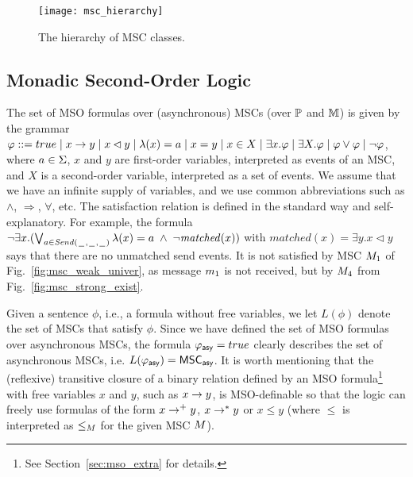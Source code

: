 \begin{figure}[h]
	\centering
	\texttt{[image: msc\_hierarchy]}
	\caption{The hierarchy of MSC classes.}
\end{figure}

\subsection{Monadic Second-Order Logic}

The set of MSO formulas over (asynchronous) MSCs (over $\mathbb{P}$ and $\mathbb{M}$) is given by the grammar
$
\varphi ::= true \mid x \to y \mid x \lhd y \mid \lambda(x) = a \mid x = y \mid x \in X \mid \exists x.\varphi \mid \exists X.\varphi \mid \varphi \vee \varphi \mid \neg \varphi
$,
where $a \in \Sigma$, $x$ and $y$ are first-order variables, interpreted as
events of an MSC, and $X$ is a second-order variable, interpreted
as a set of events. We assume that we have an infinite supply of variables,
and we use common abbreviations such as $\wedge$, $\Rightarrow$, $\forall$, etc.
The satisfaction relation is defined in the standard way and self-explanatory.
For example, the formula $\neg\exists x.(\bigvee_{a \in {\mathit{Send}(\hspace{0.1em}\underline{\hspace{0.5em}}\hspace{0.1em},\hspace{0.1em}\underline{\hspace{0.5em}}\hspace{0.1em},\hspace{0.1em}\underline{\hspace{0.5em}}\hspace{0.1em})}} \lambda(x) = a \;\wedge\; \neg \mathit{matched}(x))$
with $\mathit{matched}(x) = \exists y.x \lhd y$
says that there are no unmatched send events.
It is not satisfied by  MSC $M_{1}$
of Fig.~\ref{fig:msc_weak_univer},
as message $m_1$ is not received,
but by $M_{4}$ from Fig.~\ref{fig:msc_strong_exist}.

Given a sentence $\phi$, i.e., a formula without free variables,
we let $L(\phi)$ denote the set of MSCs that satisfy $\phi$. Since we have defined the set of MSO formulas over asynchronous MSCs, the formula $\varphi_{\mathsf{asy}} = true$ clearly describes the set of asynchronous MSCs, i.e. $L(\varphi_{\mathsf{asy}}) = \mathsf{MSC}_{\mathsf{asy}}$. It is worth mentioning that the (reflexive) transitive closure of a binary relation defined by an MSO formula\footnote{See Section~\ref{sec:mso_extra} for details.} with free variables $x$ and $y$, such as $x \to y$, is MSO-definable so that the logic can freely use formulas of the form $x \to^+ y$, $x \to^* y$ or $x \le y$ (where $\le$ is interpreted as $\le_M$ for the given MSC $M$).

